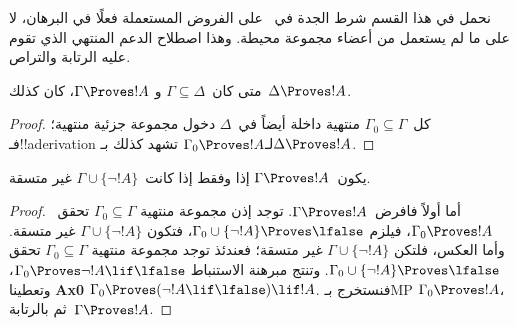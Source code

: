 \documentclass[../../../include/open-logic-section]{subfiles}
\begin{document}
      {}
      {}


\begin{editorial}
نحمل في هذا القسم شرط الجدة في~\QR{} على الفروض المستعملة فعلًا في البرهان،
لا على ما لم يستعمل من أعضاء مجموعة محيطة. وهذا اصطلاح الدعم المنتهي الذي
تقوم عليه الرتابة والتراص.
\end{editorial}

\begin{prop}[الرتابة] متى كان~$\Gamma \subseteq \Delta$ و
$\Gamma \Proves !A$، كان كذلك~$\Delta \Proves !A$.
\end{prop}

\begin{proof}
كل~$\Gamma_0 \subseteq \Gamma$ منتهية داخلة أيضاً في~$\Delta$ دخول
مجموعة جزئية منتهية؛ فـ!!a{derivation} لـ$\Gamma_0 \Proves !A$ تشهد
كذلك بـ$\Delta \Proves !A$.
\end{proof}

\begin{prop}
يكون~$\Gamma \Proves !A$ إذا وفقط إذا كانت~$\Gamma\cup \{\lnot!A \}$
غير متسقة.
\end{prop}

\begin{proof}
أما أولاً فافرض~$\Gamma \Proves !A$. توجد إذن مجموعة منتهية
$\Gamma_0 \subseteq \Gamma$ تحقق~$\Gamma_0 \Proves !A$، فيلزم
$\Gamma_0 \cup \{\lnot !A\} \Proves \lfalse$، فتكون
$\Gamma \cup \{\lnot !A\}$ غير متسقة. وأما العكس، فلتكن
$\Gamma \cup \{\lnot !A\}$ غير متسقة؛ فعندئذ توجد مجموعة منتهية
$\Gamma_0 \subseteq \Gamma$ تحقق
$\Gamma_0 \cup \{\lnot !A\} \Proves \lfalse$. وتنتج مبرهنة الاستنباط
$\Gamma_0 \Proves \lnot !A \lif \lfalse$، وتعطينا \textbf{Ax0}
$\Gamma_0 \Proves (\lnot !A \lif \lfalse) \lif !A$. فنستخرج بـMP
$\Gamma_0 \Proves !A$، ثم بالرتابة~$\Gamma \Proves !A$.
\end{proof}
\end{document}

